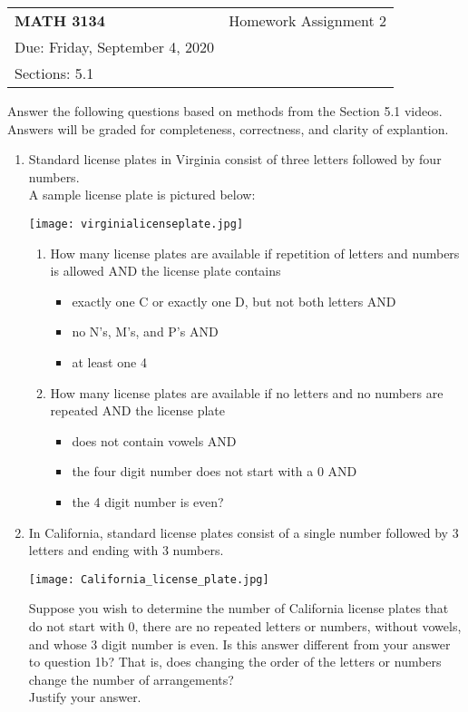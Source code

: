 \documentclass[english]{article}
\providecommand{\tabularnewline}{\\}
\begin{document}
\textbf{\Large }%
\begin{tabular}{>{\raggedright}p{5cm}>{\raggedleft}p{12.85cm}}
\textbf{\Large \hspace{-10mm}MATH 3134} & Homework Assignment 2\\
Due: Friday, September 4, 2020\\
Sections: 5.1\tabularnewline
\end{tabular}{\Large \par}
\noindent Answer the following questions based on methods from the Section 5.1 videos.\\
Answers will be graded for completeness, correctness, and clarity of explantion.
\begin{enumerate}
\item Standard license plates in Virginia consist of three letters followed by four numbers.\\  A sample license plate is pictured below:
\begin{center}
\texttt{[image: virginialicenseplate.jpg]}
\end{center}
\begin{enumerate}
\item How many license plates are available if repetition of letters and numbers is allowed AND the license plate contains
\begin{itemize}
\item exactly one C or exactly one D, but not both letters AND
\item no N's, M's, and P's AND
\item at least one 4
\end{itemize}

\newpage

\item How many license plates are available if no letters and no numbers are repeated AND the license plate
\begin{itemize}
\item does not contain vowels AND
\item the four digit number does not start with a 0 AND
\item the 4 digit number is even?
\end{itemize}


\end{enumerate}

\newpage

\item In California, standard license plates consist of a single number followed by 3 letters and ending with 3 numbers.
\begin{center}
\texttt{[image: California\_license\_plate.jpg]}
\end{center}   
Suppose you wish to determine the number of California license plates that do not start with 0, there are no repeated letters or numbers, without vowels, and whose 3 digit number is even.  Is this answer different from your answer to question 1b?  That is, does changing the order of the letters or numbers change the number of arrangements?\\
Justify your answer.
\newpage



\end{enumerate}
\end{document}
